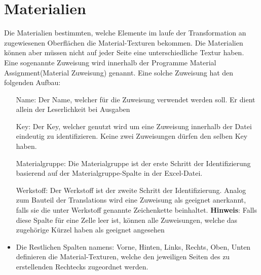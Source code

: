 \documentclass{book}
\newcommand{\hinweis}[1]{\newline \textbf{Hinweis}: #1 \newline}
\begin{document}
		\section{Materialien}
			Die Materialien bestimmten, welche Elemente im laufe der Transformation an zugewiesenen Oberflächen die Material-Texturen bekommen. Die Materialien können aber müssen nicht auf jeder Seite eine unterschiedliche Textur haben. Eine sogenannte Zuweisung wird innerhalb der Programme \glqq Material Assignment\grqq (Material Zuweisung) genannt. Eine solche Zuweisung hat den folgenden Aufbau:
				\begin{itemize}
					\setlength{\itemindent}{1cm}
					\item[Name:] Der Name, welcher für die Zuweisung verwendet werden soll. Er dient allein der Leserlichkeit bei Ausgaben
					\item[Key:] Der Key, welcher genutzt wird um eine Zuweisung innerhalb der Datei eindeutig zu identifizieren. Keine zwei Zuweisungen dürfen den selben Key haben.					
					\item[Materialgruppe:] Die Materialgruppe ist der erste Schritt der Identifizierung basierend auf der \glqq Materialgruppe\grqq-Spalte in der Excel-Datei. 
					\item[Werkstoff:] Der Werkstoff ist der zweite Schritt der Identifizierung. Analog zum Bauteil der Translations wird eine Zuweisung als geeignet anerkannt, falls sie die unter Werkstoff genannte Zeichenkette beinhaltet.
					\hinweis{Falls diese Spalte für eine Zelle leer ist, können alle Zuweisungen, welche das zugehörige Kürzel haben als geeignet angesehen}
					\item Die Restlichen Spalten namens: Vorne, Hinten, Links, Rechts, Oben, Unten definieren die Material-Texturen, welche den jeweiligen Seiten des zu erstellenden Rechtecks zugeordnet werden.
				\end{itemize}
			
\end{document}
